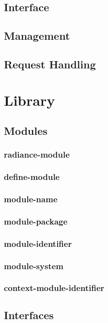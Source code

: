 \subsection{Interface}\label{sec:ser interface}
\subsection{Management}\label{sec:ser management}
\subsection{Request Handling}\label{sec:ser request handling}
\newpage
\section{Library}\label{sec:library}
\subsection{Modules}\label{sec:lib modules}
\subsubsection{radiance-module}
\subsubsection{define-module}
\subsubsection{module-name}
\subsubsection{module-package}
\subsubsection{module-identifier}
\subsubsection{module-system}
\subsubsection{context-module-identifier}
\newpage
\subsection{Interfaces}\label{sec:lib interfaces}
